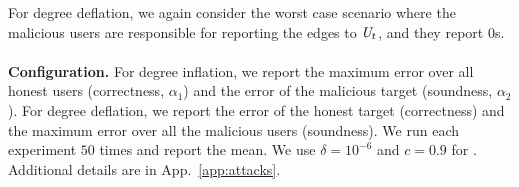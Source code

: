 For degree deflation, we again consider the worst case scenario where the malicious users are responsible for reporting the edges to $\textit{U}_t$, and they report $0$s.
\vspace{-0.2cm}\\\\
\noindent \textbf{Configuration.} %
 For degree inflation, we report the maximum error over all honest users (correctness, $\alpha_1$) and the error of the malicious target (soundness, $\alpha_2$). For degree deflation, we report the error of the honest target (correctness) and the maximum error over all the malicious users (soundness). We run each experiment $50$ times and report the mean.  We use $\delta=10^{-6}$ and $c = 0.9$ for \DegHybrid{}. Additional details are in App.~\ref{app:attacks}. %

\vspace{-0.4cm}
